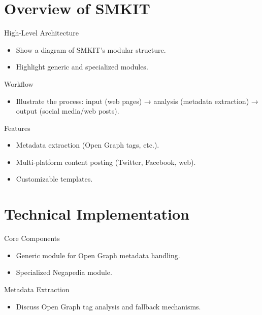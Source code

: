 \documentclass{beamer}
\begin{document}
\section{Overview of SMKIT}
    \begin{frame}{High-Level Architecture}
        \begin{itemize}
            \item Show a diagram of SMKIT’s modular structure.
            \item Highlight generic and specialized modules.
        \end{itemize}
    \end{frame}

    \begin{frame}{Workflow}
        \begin{itemize}
            \item Illustrate the process: input (web pages) → analysis (metadata extraction) → output (social media/web posts).
        \end{itemize}
    \end{frame}

    \begin{frame}{Features}
        \begin{itemize}
            \item Metadata extraction (Open Graph tags, etc.).
            \item Multi-platform content posting (Twitter, Facebook, web).
            \item Customizable templates.
        \end{itemize}
    \end{frame}


\section{Technical Implementation}
    \begin{frame}{Core Components}
        \begin{itemize}
            \item Generic module for Open Graph metadata handling.
            \item Specialized Negapedia module.
        \end{itemize}
    \end{frame}

    \begin{frame}{Metadata Extraction}
        \begin{itemize}
            \item Discuss Open Graph tag analysis and fallback mechanisms.
        \end{itemize}
    \end{frame}
\end{document}
